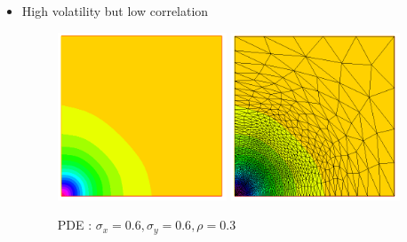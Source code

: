 \documentclass[a4paper]{report}
\begin{document}
\begin{itemize}
\begin{itemize}
\item {High volatility but low correlation}
\begin{figure}[H]
   \includegraphics[width=0.475\textwidth]{bs3a.png}
   \hfill
   \includegraphics[width=0.475\textwidth]{bs3b.png}
    \caption{ PDE : $\sigma_x=0.6, \sigma_y=0.6, \rho=0.3$}
\end{figure}






\end{itemize}
\end{itemize}
\end{document}
